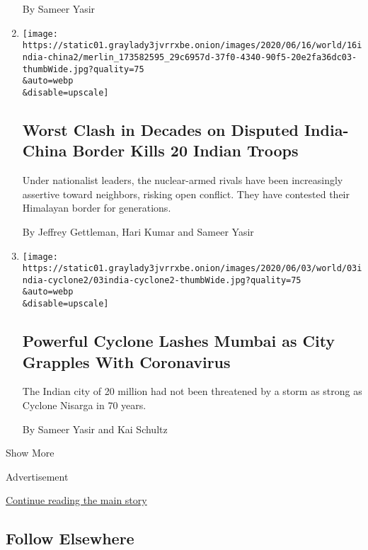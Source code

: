 \begin{enumerate}
  By Sameer Yasir
\item
  \href{/2020/06/16/world/asia/indian-china-border-clash.html}{}

  \texttt{[image: https://static01.graylady3jvrrxbe.onion/images/2020/06/16/world/16india-china2/merlin\_173582595\_29c6957d-37f0-4340-90f5-20e2fa36dc03-thumbWide.jpg?quality=75\\\&auto=webp\\\&disable=upscale]}

  \hypertarget{worst-clash-in-decades-on-disputed-india-china-border-kills-20-indian-troops}{%
  \subsection{Worst Clash in Decades on Disputed India-China Border
  Kills 20 Indian
  Troops}\label{worst-clash-in-decades-on-disputed-india-china-border-kills-20-indian-troops}}

  Under nationalist leaders, the nuclear-armed rivals have been
  increasingly assertive toward neighbors, risking open conflict. They
  have contested their Himalayan border for generations.

  By Jeffrey Gettleman, Hari Kumar and Sameer Yasir
\item
  \href{/2020/06/03/world/asia/cyclone-nisarga-india-mumbai.html}{}

  \texttt{[image: https://static01.graylady3jvrrxbe.onion/images/2020/06/03/world/03india-cyclone2/03india-cyclone2-thumbWide.jpg?quality=75\\\&auto=webp\\\&disable=upscale]}

  \hypertarget{powerful-cyclone-lashes-mumbai-as-city-grapples-with-coronavirus}{%
  \subsection{Powerful Cyclone Lashes Mumbai as City Grapples With
  Coronavirus}\label{powerful-cyclone-lashes-mumbai-as-city-grapples-with-coronavirus}}

  The Indian city of 20 million had not been threatened by a storm as
  strong as Cyclone Nisarga in 70 years.

  By Sameer Yasir and Kai Schultz
\end{enumerate}

Show More

Advertisement

\protect\hyperlink{after-mid2}{Continue reading the main story}

\hypertarget{follow-elsewhere}{%
\subsection{Follow Elsewhere}\label{follow-elsewhere}}

